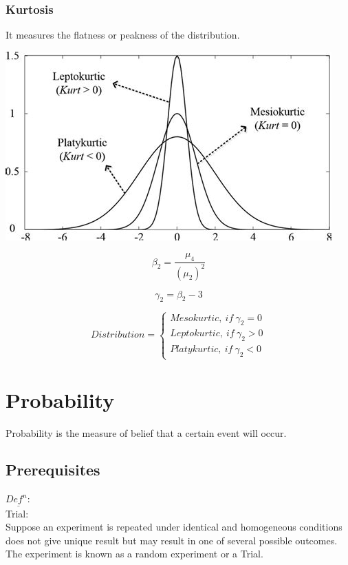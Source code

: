 \documentclass[11pt,letterpaper]{article}
\newenvironment{definition}
	{\begin{mdframed}$\underline{\textit{Def}^\textit{n}:} $\\}
	{\end{mdframed}}
\begin{document}
\subsubsection{Kurtosis}

It measures the flatness or peakness of the distribution. 

\vspace{1cm}

\includegraphics[width = \textwidth]{figs/Pasted image (2).png}

\[
  \beta_2 = \frac{\mu_4 }{(\mu_2)^2}
\]


\[
  \gamma_2 = \beta_2 - 3
\]

\[
  Distribution = \begin{cases}
    Mesokurtic,\ if\ \gamma_2 = 0\\
    Leptokurtic,\ if\ \gamma_2 > 0\\
    Platykurtic,\ if\ \gamma_2 < 0
  \end{cases}
\]

\section{Probability}
Probability is the measure of belief that a certain event will occur. 
\subsection{Prerequisites}

\begin{definition}
  Trial:\\
Suppose an experiment is repeated under identical and homogeneous conditions does not give unique result
but may result in one of several possible outcomes. The experiment is known as a random experiment or a Trial.
\end{definition}
\end{document}
